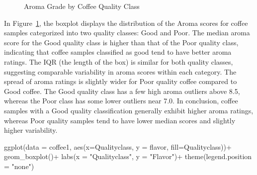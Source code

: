 \documentclass[
  letterpaper,
  DIV=11,
  numbers=noendperiod]{scrartcl}
\newenvironment{Shaded}{\begin{snugshade}}{\end{snugshade}}
\newcommand{\AttributeTok}[1]{\textcolor[rgb]{0.40,0.45,0.13}{#1}}
\newcommand{\FunctionTok}[1]{\textcolor[rgb]{0.28,0.35,0.67}{#1}}
\newcommand{\NormalTok}[1]{\textcolor[rgb]{0.00,0.23,0.31}{#1}}
\newcommand{\SpecialCharTok}[1]{\textcolor[rgb]{0.37,0.37,0.37}{#1}}
\newcommand{\StringTok}[1]{\textcolor[rgb]{0.13,0.47,0.30}{#1}}
\begin{document}
\begin{figure}[H]


\caption{\label{fig-boxplot1}Aroma Grade by Coffee Quality Class}

\end{figure}%

In Figure~\ref{fig-boxplot1}, the boxplot displays the distribution of
the Aroma scores for coffee samples categorized into two quality
classes: Good and Poor. The median aroma score for the Good quality
class is higher than that of the Poor quality class, indicating that
coffee samples classified as good tend to have better aroma ratings. The
IQR (the length of the box) is similar for both quality classes,
suggesting comparable variability in aroma scores within each category.
The spread of aroma ratings is slightly wider for Poor quality coffee
compared to Good coffee. The Good quality class has a few high aroma
outliers above 8.5, whereas the Poor class has some lower outliers near
7.0. In conclusion, coffee samples with a Good quality classification
generally exhibit higher aroma ratings, whereas Poor quality samples
tend to have lower median scores and slightly higher variability.

\begin{Shaded}
\begin{Highlighting}[]
\FunctionTok{ggplot}\NormalTok{(}\AttributeTok{data =}\NormalTok{ coffee1, }\FunctionTok{aes}\NormalTok{(}\AttributeTok{x=}\NormalTok{Qualityclass, }
                           \AttributeTok{y =}\NormalTok{ flavor, }
                           \AttributeTok{fill=}\NormalTok{Qualityclass))}\SpecialCharTok{+}
  \FunctionTok{geom\_boxplot}\NormalTok{()}\SpecialCharTok{+}
  \FunctionTok{labs}\NormalTok{(}\AttributeTok{x =} \StringTok{"Qualityclass"}\NormalTok{, }\AttributeTok{y =} \StringTok{"Flavor"}\NormalTok{)}\SpecialCharTok{+}
  \FunctionTok{theme}\NormalTok{(}\AttributeTok{legend.position =} \StringTok{"none"}\NormalTok{)}
\end{Highlighting}
\end{Shaded}
\end{document}
